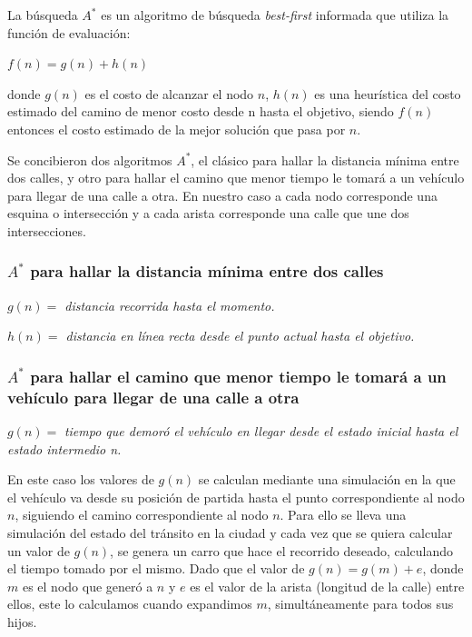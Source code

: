 \documentclass[colorinlistoftodos,twoside,twocolumn]{article} %
\begin{document}
	La b\'usqueda $ A^{*} $ es un algoritmo de búsqueda \textit{best-first} informada que utiliza la función de evaluación:
	\begin{center}
		$ f(n) = g(n) + h(n) $
	\end{center}
	donde $ g(n) $ es el costo de alcanzar el nodo $ n $, $ h(n) $ es una heur\'istica del costo estimado del camino de menor costo desde n hasta el objetivo, siendo $ f(n) $ entonces el costo estimado de la mejor soluci\'on que pasa por $ n $.
	
	Se concibieron dos algoritmos $ A^{*} $, el cl\'asico para hallar la distancia m\'inima entre dos calles, y otro para hallar el camino que menor tiempo le tomar\'a a un veh\'iculo para llegar de una calle a otra. En nuestro caso a cada nodo corresponde una esquina o intersecci\'on y a cada arista corresponde una calle que une dos intersecciones.
	
	\subsubsection{$ A^{*} $ para hallar la distancia m\'inima entre dos calles}
	
	\begin{center}
	
	\textit{$ g(n) = $ distancia recorrida hasta el momento.}
	
	\vspace{0.5em}
	\textit{$ h(n) = $ distancia en l\'inea recta desde el punto actual hasta el objetivo.}
	
	\end{center}
	
	\subsubsection{$ A^{*} $ para hallar el camino que menor tiempo le tomar\'a a un veh\'iculo para llegar de una calle a otra}
	
	\begin{center}
		\textit{$ g(n) = $ } \textit{tiempo que demor\'o el veh\'iculo en llegar desde el estado inicial hasta el \hspace{8em} estado intermedio n.}
	\end{center}	

	En este caso los valores de $g(n)$ se calculan mediante una simulaci\'on en la que el veh\'iculo va desde su posici\'on de partida hasta el punto correspondiente al nodo $n$, siguiendo el camino correspondiente al nodo $n$. Para ello se lleva una simulaci\'on del estado del tr\'ansito en la ciudad y cada vez que se quiera calcular un valor de $g(n)$, se genera un carro que hace el recorrido deseado, calculando el tiempo tomado por el mismo. Dado que el valor de $g(n) = g(m) + e$, donde $m$ es el nodo que gener\'o a $n$ y $e$ es el valor de la arista (longitud de la calle) entre ellos, este lo calculamos cuando expandimos $m$, simult\'aneamente para todos sus hijos.  
\end{document}
